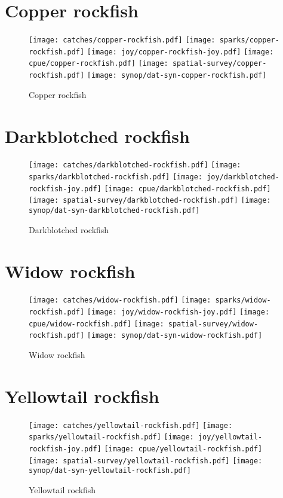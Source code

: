 \section*{Copper rockfish}

\begin{figure}[htbp]
\centering
\texttt{[image: catches/copper-rockfish.pdf]}
\texttt{[image: sparks/copper-rockfish.pdf]}
\texttt{[image: joy/copper-rockfish-joy.pdf]}
\texttt{[image: cpue/copper-rockfish.pdf]}
\texttt{[image: spatial-survey/copper-rockfish.pdf]}
\texttt{[image: synop/dat-syn-copper-rockfish.pdf]}
\caption{Copper rockfish}
\end{figure}
\clearpage
\section*{Darkblotched rockfish}

\begin{figure}[htbp]
\centering
\texttt{[image: catches/darkblotched-rockfish.pdf]}
\texttt{[image: sparks/darkblotched-rockfish.pdf]}
\texttt{[image: joy/darkblotched-rockfish-joy.pdf]}
\texttt{[image: cpue/darkblotched-rockfish.pdf]}
\texttt{[image: spatial-survey/darkblotched-rockfish.pdf]}
\texttt{[image: synop/dat-syn-darkblotched-rockfish.pdf]}
\caption{Darkblotched rockfish}
\end{figure}
\clearpage
\section*{Widow rockfish}

\begin{figure}[htbp]
\centering
\texttt{[image: catches/widow-rockfish.pdf]}
\texttt{[image: sparks/widow-rockfish.pdf]}
\texttt{[image: joy/widow-rockfish-joy.pdf]}
\texttt{[image: cpue/widow-rockfish.pdf]}
\texttt{[image: spatial-survey/widow-rockfish.pdf]}
\texttt{[image: synop/dat-syn-widow-rockfish.pdf]}
\caption{Widow rockfish}
\end{figure}
\clearpage
\section*{Yellowtail rockfish}

\begin{figure}[htbp]
\centering
\texttt{[image: catches/yellowtail-rockfish.pdf]}
\texttt{[image: sparks/yellowtail-rockfish.pdf]}
\texttt{[image: joy/yellowtail-rockfish-joy.pdf]}
\texttt{[image: cpue/yellowtail-rockfish.pdf]}
\texttt{[image: spatial-survey/yellowtail-rockfish.pdf]}
\texttt{[image: synop/dat-syn-yellowtail-rockfish.pdf]}
\caption{Yellowtail rockfish}
\end{figure}
\clearpage
